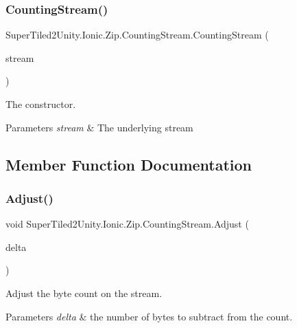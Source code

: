 \subsubsection{\texorpdfstring{Counting\+Stream()}{CountingStream()}}
{\footnotesize\ttfamily Super\+Tiled2\+Unity.\+Ionic.\+Zip.\+Counting\+Stream.\+Counting\+Stream (\begin{DoxyParamCaption}\item[{System.\+I\+O.\+Stream}]{stream }\end{DoxyParamCaption})}



The constructor. 


\begin{DoxyParams}{Parameters}
{\em stream} & The underlying stream\\
\hline
\end{DoxyParams}


\subsection{Member Function Documentation}
\mbox{\label{class_super_tiled2_unity_1_1_ionic_1_1_zip_1_1_counting_stream_a62255a1e70ebcde67b88d4631d773c0d}} 
\subsubsection{\texorpdfstring{Adjust()}{Adjust()}}
{\footnotesize\ttfamily void Super\+Tiled2\+Unity.\+Ionic.\+Zip.\+Counting\+Stream.\+Adjust (\begin{DoxyParamCaption}\item[{Int64}]{delta }\end{DoxyParamCaption})}



Adjust the byte count on the stream. 


\begin{DoxyParams}{Parameters}
{\em delta} & the number of bytes to subtract from the count. \\
\hline
\end{DoxyParams}


